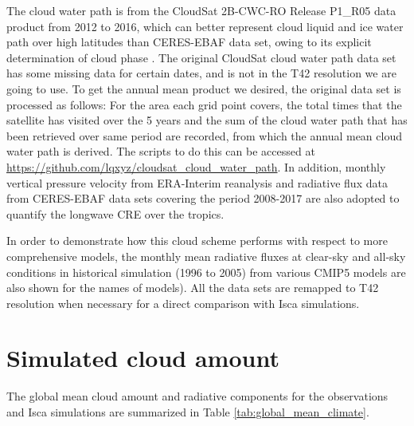 The cloud water path is from the CloudSat  2B-CWC-RO Release P1\_R05 data product \citep{Austin2009} from 2012 to 2016, which can better represent cloud liquid and ice water path over high latitudes than CERES-EBAF data set, owing to its explicit determination of cloud phase \citep{Lenaerts2017}. The original CloudSat cloud water path data set has some missing data for certain dates, and is not in the T42 resolution we are going to use. To get the annual mean product we desired, the original data set is processed as follows: For the area each grid point covers, the total times that the satellite has visited over the 5 years and the sum of the cloud water path that has been retrieved over same period are recorded, from which the annual mean cloud water path is derived. The scripts to do this can be accessed at \url{https://github.com/lqxyz/cloudsat_cloud_water_path}. In addition, monthly vertical pressure velocity from ERA-Interim reanalysis and radiative flux data from CERES-EBAF data sets covering the period 2008-2017 are also adopted to quantify the longwave CRE over the tropics.

In order to demonstrate how this cloud scheme performs with respect to more comprehensive models, the monthly mean radiative fluxes at clear-sky and all-sky conditions in historical simulation (1996 to 2005) from various CMIP5 models are also shown for the names of models). All the data sets are remapped to T42 resolution when necessary for a direct comparison with Isca simulations.

\section{Simulated cloud amount}
\label{sec:cld_amt}

The global mean cloud amount and radiative components for the observations and Isca simulations are summarized in Table \ref{tab:global_mean_climate}. 

